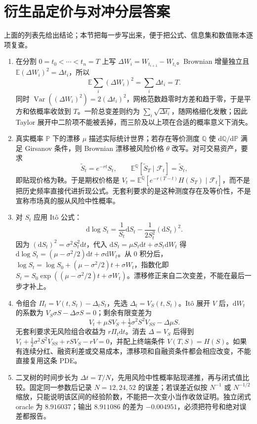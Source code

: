 \chapter{衍生品定价与对冲分层答案}

上面的列表先给出结论；本节把每一步写出来，便于把公式、信息集和数值账本逐项复查。
\begin{enumerate}[leftmargin=*]
  \item 在分割 $0=t_0<\cdots<t_n=T$ 上写 $\Delta W_i=W_{t_{i+1}}-W_{t_i}$。Brownian 增量独立且 $\mathbb E(\Delta W_i)^2=\Delta t_i$，所以
  \[
    \mathbb E\sum_i(\Delta W_i)^2=\sum_i\Delta t_i=T.
  \]
  同时 $\operatorname{Var}((\Delta W_i)^2)=2(\Delta t_i)^2$，网格范数趋零时方差和趋于零，于是平方和依概率收敛到 $T$。一阶总变差则约为 $\sum_i\sqrt{\Delta t_i}$，随网格细化发散；因此 Taylor 展开中二阶项不能被丢掉，而三阶及以上项在合适的概率意义下消失。
  \item 真实概率 $\mathbb P$ 下的漂移 $\mu$ 描述实际统计世界；若存在等价测度 $\mathbb Q$ 使 $\mathrm d\mathbb Q/\mathrm d\mathbb P$ 满足 Girsanov 条件，则 Brownian 漂移被风险价格 $\theta$ 改写。对可交易资产，要求
  \[
    \widetilde S_t=e^{-rt}S_t,\qquad \mathbb E^{\mathbb Q}[\widetilde S_T\mid\mathcal F_t]=\widetilde S_t,
  \]
  即贴现价格为鞅。于是期权价格是 $V_t=\mathbb E^{\mathbb Q}[e^{-r(T-t)}H(S_T)\mid\mathcal F_t]$，而不是把历史频率直接代进折现公式。无套利要求的是这种测度存在及等价性，不是宣称市场真的服从风险中性概率。
  \item 对 $S_t$ 应用 Itô 公式：
  \[
    \mathrm d\log S_t=\frac1{S_t}\mathrm dS_t-
       \frac1{2S_t^2}(\mathrm dS_t)^2.
  \]
  因为 $(\mathrm dS_t)^2=\sigma^2S_t^2\mathrm dt$，代入 $\mathrm dS_t=\mu S_t\mathrm dt+\sigma S_t\mathrm dW_t$ 得
  $\mathrm d\log S_t=(\mu-\sigma^2/2)\mathrm dt+\sigma\mathrm dW_t$。从 $0$ 积分后，
  $\log S_t=\log S_0+(\mu-\sigma^2/2)t+\sigma W_t$，指数化即 $S_t=S_0\exp((\mu-\sigma^2/2)t+\sigma W_t)$。漂移修正来自二次变差，不能在最后一步才补上。
  \item 令组合 $\Pi_t=V(t,S_t)-\Delta_tS_t$，先选 $\Delta_t=V_S(t,S_t)$。Itô 展开 $V$ 后，$\mathrm dW_t$ 的系数为 $V_S\sigma S-\Delta\sigma S=0$；剩余有限变差为
  \[
    V_t+\mu S V_S+\tfrac12\sigma^2S^2V_{SS}-\Delta\mu S.
  \]
  无套利要求无风险组合收益为 $r\Pi_t\mathrm dt$。消去 $\Delta=V_S$ 后得到
  $V_t+\frac12\sigma^2S^2V_{SS}+rSV_S-rV=0$，并配上终端条件 $V(T,S)=H(S)$。如果有连续分红、融资利差或交易成本，漂移项和自融资条件都会相应改变，不能直接复用这条 PDE。
  \item 二叉树的时间步长为 $\Delta t=T/N$，先用风险中性概率贴现递推，再与闭式值比较。固定同一参数后记录 $N=12,24,52$ 的误差；若误差近似按 $N^{-1}$ 或 $N^{-1/2}$ 缩放，只能说明该区间的经验阶数，不能把一次变小当作收敛证明。独立闭式 oracle 为 $8.916037$；输出 $8.911086$ 的差为 $-0.004951$，必须把符号和绝对误差都报告。

\end{enumerate}
